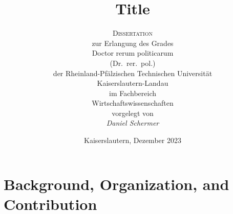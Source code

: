 \documentclass[paper=A4,
BCOR=10mm, %
DIV=12, %
fontsize=11pt,
twoside=true,
open=right,
headsepline, %
listof=totoc,
headings=normal, %
footinclude=false, %
headinclude=true %
]{scrbook}
\begin{document}
\titlehead{}
\title{Title}

\author{\textsc{Dissertation}\\
  zur Erlangung des Grades\\
  \glqq Doctor rerum politicarum\grqq\\
  \normalsize (Dr.~rer.~pol.)\\[2em]
  der Rheinland-Pfälzischen Technischen Universität\\
  Kaiserslautern-Landau \\
  \normalsize im Fachbereich\\
  Wirtschaftswissenschaften\\[4em]
  \normalsize vorgelegt von\\
  \textit{Daniel Schermer}
}
\date{Kaiserslautern, Dezember 2023}
\uppertitleback{}
\lowertitleback{}
\dedication{404 not found}

\frontmatter
\maketitle
\tableofcontents
\printglossary[type=main,title={List of Abbreviations}]
\listofalgorithms{}
\listoffigures
\listoftables

\mainmatter
\chapter{Background, Organization, and Contribution}
\end{document}
